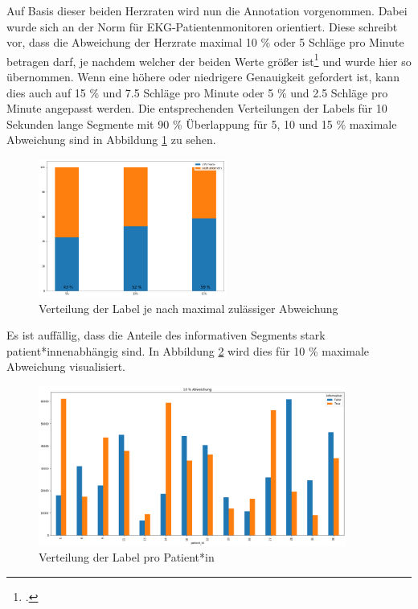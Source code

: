 	Auf Basis dieser beiden Herzraten wird nun die Annotation vorgenommen. Dabei wurde sich an der Norm für \ac{EKG}-Patientenmonitoren orientiert. Diese schreibt vor, dass die Abweichung der Herzrate maximal 10 \% oder 5 Schläge pro Minute betragen darf, je nachdem welcher der beiden Werte größer ist\footcite[]{} und wurde hier so übernommen. Wenn eine höhere oder niedrigere Genauigkeit gefordert ist, kann dies auch auf 15 \% und 7.5 Schläge pro Minute oder 5 \% und 2.5 Schläge pro Minute angepasst werden. Die entsprechenden Verteilungen der Labels für 10 Sekunden lange Segmente mit 90 \% Überlappung für 5, 10 und 15 \% maximale Abweichung sind in Abbildung \ref{fig:label-distribution} zu sehen.
	
	\begin{figure}[H]
		\centering
		\includegraphics[width=0.55\textwidth]{pic/label-distribution.png}
		\caption[Verteilung der Label je nach maximal zulässiger Abweichung]{Verteilung der Label je nach maximal zulässiger Abweichung}
		\label{fig:label-distribution}
	\end{figure}
	
	Es ist auffällig, dass die Anteile des informativen Segments stark patient*innenabhängig sind. In Abbildung \ref{fig:data-stats-15} wird dies für 10 \% maximale Abweichung visualisiert.
	
	
	\begin{figure}[H]
		\centering
		\includegraphics[width=0.9\textwidth]{pic/data-stats-10.png}
		\caption[Verteilung der Label pro Patient*in]{Verteilung der Label pro Patient*in}
		\label{fig:data-stats-15}
	\end{figure}
		

